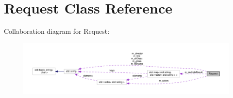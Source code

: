 \hypertarget{classRequest}{}\section{Request Class Reference}
\label{classRequest}


Collaboration diagram for Request\+:\nopagebreak
\begin{figure}[H]
\begin{center}
\leavevmode
\includegraphics[width=350pt]{classRequest__coll__graph}
\end{center}
\end{figure}
